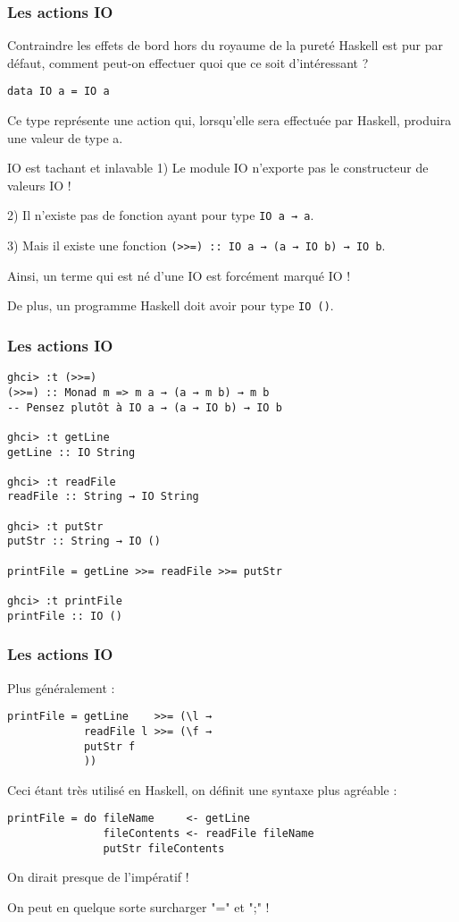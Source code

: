 \documentclass[10pt]{beamer}
\begin{document}
\begin{frame}[fragile]
\frametitle{Les actions IO}
\begin{block}
{Contraindre les effets de bord hors du royaume de la pureté}
Haskell est pur par défaut, comment peut-on effectuer quoi que ce soit
d'intéressant ?

\verb|data IO a = IO a|

Ce type représente une action qui, lorsqu'elle sera effectuée par Haskell,
produira une valeur de type a.
\end{block}

\begin{block}
{IO est tachant et inlavable}
1) Le module IO n'exporte pas le constructeur de valeurs IO !

2) Il n'existe pas de fonction ayant pour type \verb|IO a → a|.

3) Mais il existe une fonction \verb|(>>=) :: IO a → (a → IO b) → IO b|.

Ainsi, un terme qui est né d'une IO est forcément marqué IO !
\end{block}

De plus, un programme Haskell doit avoir pour type \verb|IO ()|.
\end{frame}



\begin{frame}[fragile]
\frametitle{Les actions IO}
\begin{verbatim}
ghci> :t (>>=)
(>>=) :: Monad m => m a → (a → m b) → m b
-- Pensez plutôt à IO a → (a → IO b) → IO b

ghci> :t getLine
getLine :: IO String

ghci> :t readFile
readFile :: String → IO String

ghci> :t putStr
putStr :: String → IO ()

printFile = getLine >>= readFile >>= putStr

ghci> :t printFile
printFile :: IO ()
\end{verbatim}
\end{frame}



\begin{frame}[fragile]
\frametitle{Les actions IO}
Plus généralement :
\begin{verbatim}
printFile = getLine    >>= (\l →
            readFile l >>= (\f →
            putStr f
            ))
\end{verbatim}

Ceci étant très utilisé en Haskell, on définit une syntaxe plus agréable :

\begin{verbatim}
printFile = do fileName     <- getLine
               fileContents <- readFile fileName
               putStr fileContents
\end{verbatim}

On dirait presque de l'impératif !

On peut en quelque sorte surcharger "=" et ";" !
\end{frame}
\end{document}
